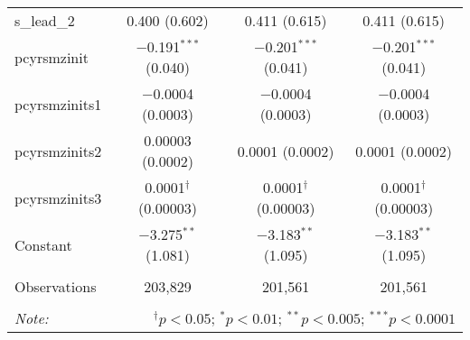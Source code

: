 \begin{table}[!htbp]
\begin{tabular}{@{\extracolsep{5pt}}lccc}
  s\_lead\_2 & 0.400 (0.602) & 0.411 (0.615) & 0.411 (0.615) \\ 
  pcyrsmzinit & $-$0.191$^{***}$ (0.040) & $-$0.201$^{***}$ (0.041) & $-$0.201$^{***}$ (0.041) \\ 
  pcyrsmzinits1 & $-$0.0004 (0.0003) & $-$0.0004 (0.0003) & $-$0.0004 (0.0003) \\ 
  pcyrsmzinits2 & 0.00003 (0.0002) & 0.0001 (0.0002) & 0.0001 (0.0002) \\ 
  pcyrsmzinits3 & 0.0001$^{\dagger}$ (0.00003) & 0.0001$^{\dagger}$ (0.00003) & 0.0001$^{\dagger}$ (0.00003) \\ 
  Constant & $-$3.275$^{**}$ (1.081) & $-$3.183$^{**}$ (1.095) & $-$3.183$^{**}$ (1.095) \\ 
 \hline \\[-1.8ex] 
Observations & 203,829 & 201,561 & 201,561 \\ 
\hline 
\hline \\[-1.8ex] 
\textit{Note:}  & \multicolumn{3}{r}{$^{\dagger} p<0.05$; $^{*} p<0.01$; $^{**} p<0.005$; $^{***} p<0.0001$} \\ 
\end{tabular} 
\end{table} 
